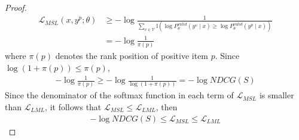 \documentclass[sigconf,natbib=true]{acmart}
\begin{document}
\begin{proof}
\begin{equation}
\begin{aligned}
\mathcal{L}_{MSL}(x,y^p;\theta) 
&\geq - \log \frac{1}{\sum_{v \in \mathcal{V}} \mathbb{I}(\log P_{\theta}^{valid} \left(y^v \mid x \right) \geq \log P_{\theta}^{valid} \left(y^p \mid x \right))} \\
&= - \log \frac{1}{\pi(p)}
\end{aligned}
\end{equation}
where $\pi(p)$  denotes the rank position of positive item $p$. Since \(\log(1 + \pi(p)) \leq \pi(p)\), 
\begin{equation}
\begin{aligned}
 - \log \frac{1}{\pi(p)} \geq - \log \frac{1}{\log(1+\pi(p))} = - \log NDCG(S)
\end{aligned}
\end{equation}
Since the denominator of the softmax function in each term of \(\mathcal{L}_{{MSL}}\) is smaller than \(\mathcal{L}_{LML}\), it follows that \(\mathcal{L}_{MSL} \leq \mathcal{L}_{LML}\), then
\begin{equation}
\begin{aligned}
 -\log NDCG(S) \leq \mathcal{L}_{MSL}  \leq \mathcal{L}_{LML}
\end{aligned}
\end{equation}

\end{proof}
\end{document}
